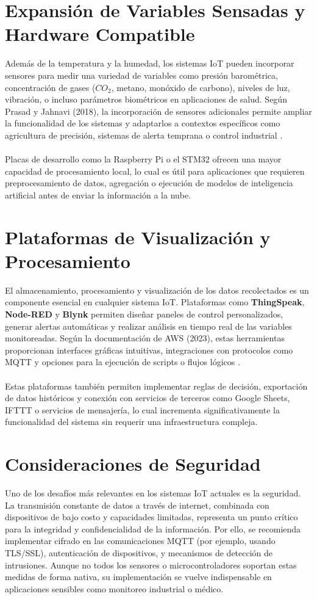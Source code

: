 \section{Expansión de Variables Sensadas y Hardware Compatible}
Además de la temperatura y la humedad, los sistemas IoT pueden incorporar sensores para medir una variedad de variables como presión barométrica, concentración de gases ($CO_2$, metano, monóxido de carbono), niveles de luz, vibración, o incluso parámetros biométricos en aplicaciones de salud. Según Prasad y Jahnavi (2018), la incorporación de sensores adicionales permite ampliar la funcionalidad de los sistemas y adaptarlos a contextos específicos como agricultura de precisión, sistemas de alerta temprana o control industrial \cite{Prasad2018}.
\\\\
Placas de desarrollo como la Raspberry Pi o el STM32 ofrecen una mayor capacidad de procesamiento local, lo cual es útil para aplicaciones que requieren preprocesamiento de datos, agregación o ejecución de modelos de inteligencia artificial antes de enviar la información a la nube.
\section{Plataformas de Visualización y Procesamiento}
El almacenamiento, procesamiento y visualización de los datos recolectados es un componente esencial en cualquier sistema IoT. Plataformas como \textbf{ThingSpeak}, \textbf{Node-RED} y \textbf{Blynk} permiten diseñar paneles de control personalizados, generar alertas automáticas y realizar análisis en tiempo real de las variables monitoreadas. Según la documentación de AWS (2023), estas herramientas proporcionan interfaces gráficas intuitivas, integraciones con protocolos como MQTT y opciones para la ejecución de scripts o flujos lógicos \cite{AWS-MQTT}.
\\\\
Estas plataformas también permiten implementar reglas de decisión, exportación de datos históricos y conexión con servicios de terceros como Google Sheets, IFTTT o servicios de mensajería, lo cual incrementa significativamente la funcionalidad del sistema sin requerir una infraestructura compleja.
\section{Consideraciones de Seguridad}
Uno de los desafíos más relevantes en los sistemas IoT actuales es la seguridad. La transmisión constante de datos a través de internet, combinada con dispositivos de bajo costo y capacidades limitadas, representa un punto crítico para la integridad y confidencialidad de la información. Por ello, se recomienda implementar cifrado en las comunicaciones MQTT (por ejemplo, usando TLS/SSL), autenticación de dispositivos, y mecanismos de detección de intrusiones. Aunque no todos los sensores o microcontroladores soportan estas medidas de forma nativa, su implementación se vuelve indispensable en aplicaciones sensibles como monitoreo industrial o médico.